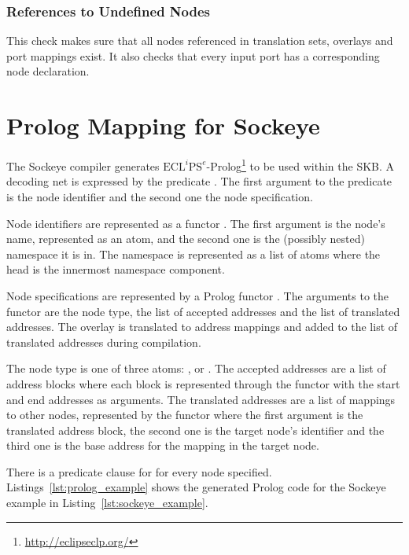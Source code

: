 \documentclass[a4paper,11pt,twoside]{report}
\begin{document}
{{{\subsection{References to Undefined Nodes}
This check makes sure that all nodes referenced in translation sets, overlays and port mappings exist.
It also checks that every input port has a corresponding node declaration.


\chapter{Prolog Mapping for Sockeye}
\label{chap:prolog}
The Sockeye compiler generates \(\text{ECL}^i\text{PS}^e\)-Prolog\footnote{\href{http://eclipseclp.org/}{http://eclipseclp.org/}} to be used within the SKB.
A decoding net is expressed by the predicate .
The first argument to the predicate is the node identifier and the second one the node specification.

Node identifiers are represented as a functor .
The first argument is the node's name, represented as an atom, and the second one is the (possibly nested) namespace it is in.
The namespace is represented as a list of atoms where the head is the innermost namespace component.

Node specifications are represented by a Prolog functor .
The arguments to the functor are the node type, the list of accepted addresses and the list of translated addresses.
The overlay is translated to address mappings and added to the list of translated addresses during compilation.

The node type is one of three atoms: ,  or .
The accepted addresses are a list of address blocks where each block is represented through the functor  with the start and end addresses as arguments.
The translated addresses are a list of mappings to other nodes, represented by the functor  where the first argument is the translated address block, the second one is the target node's identifier and the third one is the base address for the mapping in the target node.

There is a predicate clause for  for every node specified. 
Listings~\ref{lst:prolog_example} shows the generated Prolog code for the Sockeye example in Listing~\ref{lst:sockeye_example}.

}}}
\end{document}
